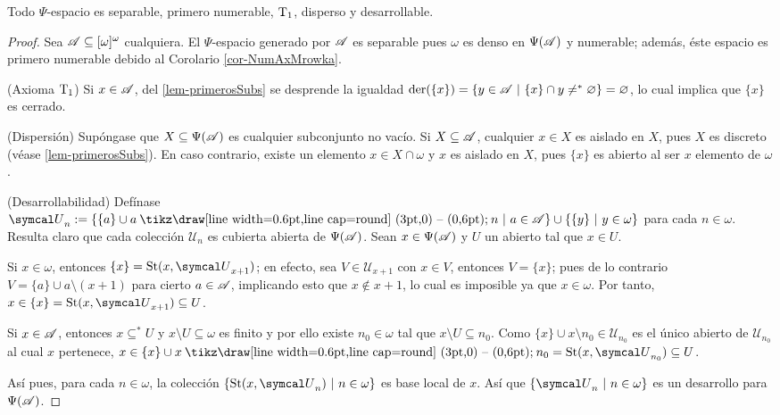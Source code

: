 \begin{proposicion}\label{prop-PsiSiempre}
	Todo $\Psi$-espacio es separable, primero numerable, $\operatorname{T}_1$, disperso y desarrollable.
\end{proposicion}

\begin{proof}
	Sea $\mathscr{A} \subseteq [\omega]^\omega$ cualquiera. El $\Psi$-espacio generado por $\mathscr{A}$ es separable pues $\omega$ es denso en $\Psi(\mathscr{A})$ y numerable; además, éste espacio es primero numerable debido al Corolario \ref{cor-NumAxMrowka}.

	(Axioma $\operatorname{T}_1$) Si $x \in \mathscr{A}$, del \autoref{lem-primerosSubs} se desprende la igualdad $\operatorname{der}(\{x\})=\{y \in \mathscr{A} \text{ $|$ } \{x\} \cap y \neq^* \varnothing \}=\varnothing$, lo cual implica que $\{x\}$ es cerrado.

	(Dispersión) Supóngase que $X \subseteq \Psi(\mathscr{A})$ es cualquier subconjunto no vacío. Si $X \subseteq \mathscr{A}$, cualquier $x \in X$ es aislado en $X$, pues $X$ es discreto (véase \ref{lem-primerosSubs}). En caso contrario, existe un elemento $x \in X \cap \omega$ y $x$ es aislado en $X$, pues $\{x\}$ es abierto al ser $x$ elemento de $\omega$.

	(Desarrollabilidad) Defínase $\mathcal{U}_n:=\{ \{a\} \cup a \setminus n \tq a \in \ms{A} \} \cup \{ \{y\} \tq y \in \omega \}$ para cada $n \in \omega$. Resulta claro que cada colección $\mathcal{U}_n$ es cubierta abierta de $\Psi(\mathscr{A})$. Sean $x \in \Psi(\mathscr{A})$ y $U$ un abierto tal que $x \in U$.

	Si $x \in \omega$, entonces $\{x\} = \St(x, \mathcal{U}_{x+1})$; en efecto, sea $V \in \mathcal{U}_{x+1}$ con $x \in V$, entonces $V=\{x\}$; pues de lo contrario $V =\{a\} \cup a \setminus (x+1)$ para cierto $a \in \mathscr{A}$, implicando esto que $x \notin x+1$, lo cual es imposible ya que $x \in \omega$. Por tanto, $x \in \{x\} = \St(x,\mathcal{U}_{x+1}) \subseteq U$.

	Si $x \in \mathscr{A}$, entonces $x \subseteq^* U$ y $x \setminus U \subseteq \omega$ es finito y por ello existe $n_0 \in \omega$ tal que $x \setminus U \subseteq n_0$. Como $\{x\} \cup x \setminus n_0 \in \mathcal{U}_{n_0}$ es el único abierto de $\mathcal{U}_{n_0}$ al cual $x$ pertenece, $x \in \{x\} \cup x \setminus n_0 = \St(x, \mathcal{U}_{n_0}) \subseteq U$.

	Así pues, para cada $n \in \omega$, la colección $\{\St(x, \mathcal{U}_n) \tq n \in \omega\}$ es base local de $x$. Así que $\{\mathcal{U}_n \tq n \in \omega \}$ es un desarrollo para $\Psi(\mathscr{A})$.
\end{proof}

